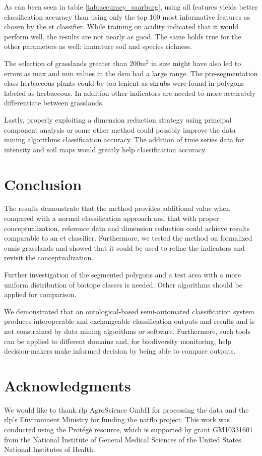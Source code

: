 \documentclass[authoryear,review,12pt,number]{elsarticle}
\begin{document}
As can been seen in table \ref{tab:accuracy_saarburg}, using all features 
yields better classification accuracy than using only the top 100 most 
informative features as chosen by the \gls{et} classifier. While training on 
acidity indicated that it would perform well, the results are not nearly 
as good. The same holds true for the other parameters as well: immature 
soil and species richness.

The selection of grasslands greater than 200m$^{2}$ in size might have also led 
to errors as max and min values in the \gls{dsm} had a large range. The 
pre-segmentation class herbaceous plants could be too lenient as shrubs were 
found in polygons labeled as herbaceous. In addition other indicators are 
needed to more accurately differentiate between grasslands.

Lastly, properly exploiting a dimension reduction strategy using principal 
component analysis or some other method could possibly improve the data mining 
algorithms classification accuracy. The addition of time series data for 
intensity and soil maps would greatly help classification accuracy.
\section{Conclusion}
The results demonstrate that the method provides additional value when compared 
with a normal classification approach and that with proper conceptualization, 
reference data and dimension reduction could achieve results comparable to an 
\gls{et} classifier. Furthermore, we tested the method on formalized 
\gls{eunis} grasslands and showed that it could be used to refine the 
indicators and revisit the conceptualization. 

Further investigation of the segmented polygons and a test area with a more
uniform distribution of biotope classes is needed. Other 
algorithms should be applied for comparison.

We demonstrated that an ontological-based semi-automated classification system
produces interoperable and exchangeable classification outputs
and results and is not constrained by data mining
algorithms or software. Furthermore, such tools can be applied to different 
domains and, for biodiversity monitoring, help decision-makers make informed 
decision by being able to compare outputs.
\section{Acknowledgments}
We would like to thank \gls{rlp} AgroScience GmbH for processing the data and 
the \gls{rlp}'s Environment Ministry for funding the \gls{natflo} project. This 
work was conducted using the Prot\'eg\'e resource, which is supported by grant 
GM10331601 from the National Institute of General Medical Sciences of the 
United States National Institutes of Health.
\end{document}
